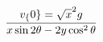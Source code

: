 \documentclass[preview]{standalone}
\begin{document}
\begin{align*}
v_\{0\}={\sqrt  x^{2}g} \over {x\sin 2\theta -2y\cos ^{2}\theta  }
\end{align*}
\end{document}
